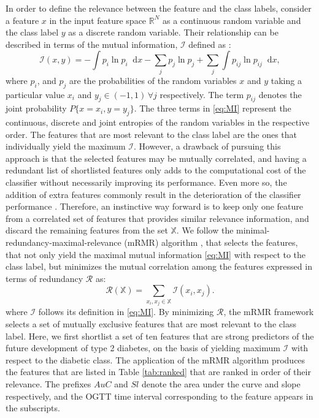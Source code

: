 \documentclass[journal,comsoc]{IEEEtran}
\renewcommand{\^}{\hat}  %
\newcommand*\diff{\mathop{}\!\mathrm{d}} %
\begin{document}
In order to define the relevance between the feature and the class labels, consider a feature $x$ in the input feature space $\mathbb R^N$ as a continuous random variable and the class label $y$ as a discrete random variable. Their relationship can be described in terms of the mutual information, $\mathcal I$ defined as \cite{ross2014mutual}:
%
\begin{equation}
  \mathcal I(x, y) = - \int p_i \ln p_i \diff x - \sum \limits_j p_j\ln p_j + \sum_j \int p_{ij}\ln p_{ij} \diff x,
  \label{eq:MI}
\end{equation}
%
where $p_{i}$, and $p_{j}$ are the probabilities of the random variables $x$ and $y$ taking a particular value $x_i$ and $y_j \in (-1,1) \, \forall j$ respectively. The term $p_{ij}$ denotes the joint probability $P\{x= x_i, y=y_j\}$. The three terms in \eqref{eq:MI} represent the continuous, discrete and joint entropies of the random variables in the respective order. The features that are most relevant to the class label are the ones that individually yield the maximum $\mathcal I$. However, a drawback of pursuing this approach is that the selected features may be mutually correlated, and having a redundant list of shortlisted features only adds to the computational cost of the classifier without necessarily improving its performance. Even more so, the addition of extra features commonly result in the deterioration of the classifier performance \cite{trunk1979problem}. Therefore, an instinctive way forward is to keep only one feature from a correlated set of features that provides similar relevance information, and discard the remaining features from the set $\mathbb X$. We follow the minimal-redundancy-maximal-relevance (mRMR) algorithm \cite{mRMR}, that selects the features, that not only yield the maximal mutual information \eqref{eq:MI} with respect to the class label, but minimizes the mutual correlation among the features expressed in terms of redundancy $\mathcal R$ as:
%
\begin{equation}
  \mathcal R(\mathbb X) = \sum \limits_{x_i, x_j \in \mathbb{X}} \mathcal {I}(x_i, x_j).
  \label{eq:R}
\end{equation}
%
where $\mathcal I$ follows its definition in \eqref{eq:MI}. By minimizing $\mathcal R$, the mRMR framework selects a set of mutually exclusive features that are most relevant to the class label. Here, we first shortlist a set of ten features that are strong predictors of the future development of type 2 diabetes, on the basis of yielding maximum $\mathcal{I}$ with respect to the diabetic class. The application of the mRMR algorithm produces the features that are listed in Table \ref{tab:ranked} that are ranked in order of their relevance. The prefixes $AuC$ and $Sl$ denote the area under the curve and slope respectively, and the OGTT time interval corresponding to the feature appears in the subscripts.
\end{document}
